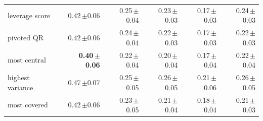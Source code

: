 \begin{tabular}{lrrrrr}
leverage score & 0.42\,{\scriptsize$\pm$0.06} & 0.25\,{\scriptsize$\pm$0.04} & 0.23\,{\scriptsize$\pm$0.03} & 0.17\,{\scriptsize$\pm$0.03} & 0.24\,{\scriptsize$\pm$0.03} \\
pivoted QR & 0.42\,{\scriptsize$\pm$0.06} & 0.24\,{\scriptsize$\pm$0.04} & 0.22\,{\scriptsize$\pm$0.03} & 0.17\,{\scriptsize$\pm$0.03} & 0.22\,{\scriptsize$\pm$0.03} \\
most central & \textbf{0.40\,{\scriptsize$\pm$0.06}} & 0.22\,{\scriptsize$\pm$0.04} & 0.20\,{\scriptsize$\pm$0.04} & 0.17\,{\scriptsize$\pm$0.04} & 0.22\,{\scriptsize$\pm$0.04} \\
highest variance & 0.47\,{\scriptsize$\pm$0.07} & 0.25\,{\scriptsize$\pm$0.05} & 0.26\,{\scriptsize$\pm$0.05} & 0.21\,{\scriptsize$\pm$0.06} & 0.26\,{\scriptsize$\pm$0.05} \\
most covered & 0.42\,{\scriptsize$\pm$0.06} & 0.23\,{\scriptsize$\pm$0.05} & 0.21\,{\scriptsize$\pm$0.04} & 0.18\,{\scriptsize$\pm$0.04} & 0.21\,{\scriptsize$\pm$0.03} \\
\bottomrule
\end{tabular}
